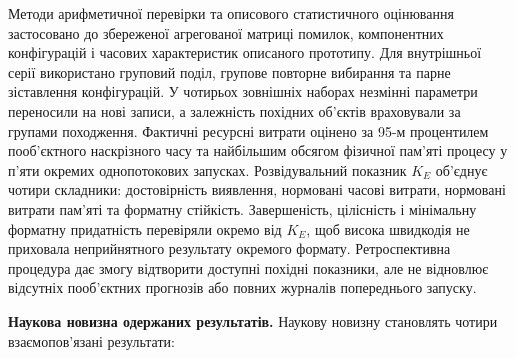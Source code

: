 Методи арифметичної перевірки та описового статистичного оцінювання застосовано до збереженої агрегованої матриці помилок, компонентних конфігурацій і часових характеристик описаного прототипу. Для внутрішньої серії використано груповий поділ, групове повторне вибирання та парне зіставлення конфігурацій. У чотирьох зовнішніх наборах незмінні параметри переносили на нові записи, а залежність похідних об’єктів враховували за групами походження. Фактичні ресурсні витрати оцінено за 95-м процентилем пооб’єктного наскрізного часу та найбільшим обсягом фізичної пам’яті процесу у п’яти окремих однопотокових запусках. Розвідувальний показник $K_E$ об’єднує чотири складники: достовірність виявлення, нормовані часові витрати, нормовані витрати пам’яті та форматну стійкість. Завершеність, цілісність і мінімальну форматну придатність перевіряли окремо від $K_E$, щоб висока швидкодія не приховала неприйнятного результату окремого формату. Ретроспективна процедура дає змогу відтворити доступні похідні показники, але не відновлює відсутніх пооб’єктних прогнозів або повних журналів попереднього запуску.

\textbf{Наукова новизна одержаних результатів.}
Наукову новизну становлять чотири взаємопов’язані результати:

